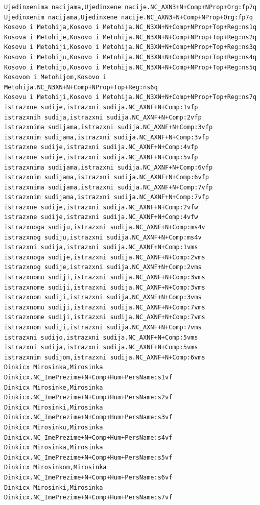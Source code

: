 \begin{verbatim}
Ujedinxenima nacijama,Ujedinxene nacije.NC_AXN3+N+Comp+NProp+Org:fp7q
Ujedinxenim nacijama,Ujedinxene nacije.NC_AXN3+N+Comp+NProp+Org:fp7q
Kosovo i Metohija,Kosovo i Metohija.NC_N3XN+N+Comp+NProp+Top+Reg:ns1q
Kosova i Metohije,Kosovo i Metohija.NC_N3XN+N+Comp+NProp+Top+Reg:ns2q
Kosovu i Metohiji,Kosovo i Metohija.NC_N3XN+N+Comp+NProp+Top+Reg:ns3q
Kosovo i Metohiju,Kosovo i Metohija.NC_N3XN+N+Comp+NProp+Top+Reg:ns4q
Kosovo i Metohijo,Kosovo i Metohija.NC_N3XN+N+Comp+NProp+Top+Reg:ns5q
Kosovom i Metohijom,Kosovo i Metohija.NC_N3XN+N+Comp+NProp+Top+Reg:ns6q
Kosovu i Metohiji,Kosovo i Metohija.NC_N3XN+N+Comp+NProp+Top+Reg:ns7q
istrazxne sudije,istrazxni sudija.NC_AXNF+N+Comp:1vfp
istrazxnih sudija,istrazxni sudija.NC_AXNF+N+Comp:2vfp
istrazxnima sudijama,istrazxni sudija.NC_AXNF+N+Comp:3vfp
istrazxnim sudijama,istrazxni sudija.NC_AXNF+N+Comp:3vfp
istrazxne sudije,istrazxni sudija.NC_AXNF+N+Comp:4vfp
istrazxne sudije,istrazxni sudija.NC_AXNF+N+Comp:5vfp
istrazxnima sudijama,istrazxni sudija.NC_AXNF+N+Comp:6vfp
istrazxnim sudijama,istrazxni sudija.NC_AXNF+N+Comp:6vfp
istrazxnima sudijama,istrazxni sudija.NC_AXNF+N+Comp:7vfp
istrazxnim sudijama,istrazxni sudija.NC_AXNF+N+Comp:7vfp
istrazxne sudije,istrazxni sudija.NC_AXNF+N+Comp:2vfw
istrazxne sudije,istrazxni sudija.NC_AXNF+N+Comp:4vfw
istrazxnoga sudiju,istrazxni sudija.NC_AXNF+N+Comp:ms4v
istrazxnog sudiju,istrazxni sudija.NC_AXNF+N+Comp:ms4v
istrazxni sudija,istrazxni sudija.NC_AXNF+N+Comp:1vms
istrazxnoga sudije,istrazxni sudija.NC_AXNF+N+Comp:2vms
istrazxnog sudije,istrazxni sudija.NC_AXNF+N+Comp:2vms
istrazxnomu sudiji,istrazxni sudija.NC_AXNF+N+Comp:3vms
istrazxnome sudiji,istrazxni sudija.NC_AXNF+N+Comp:3vms
istrazxnom sudiji,istrazxni sudija.NC_AXNF+N+Comp:3vms
istrazxnomu sudiji,istrazxni sudija.NC_AXNF+N+Comp:7vms
istrazxnome sudiji,istrazxni sudija.NC_AXNF+N+Comp:7vms
istrazxnom sudiji,istrazxni sudija.NC_AXNF+N+Comp:7vms
istrazxni sudijo,istrazxni sudija.NC_AXNF+N+Comp:5vms
istrazxni sudija,istrazxni sudija.NC_AXNF+N+Comp:5vms
istrazxnim sudijom,istrazxni sudija.NC_AXNF+N+Comp:6vms
Dinkicx Mirosinka,Mirosinka Dinkicx.NC_ImePrezime+N+Comp+Hum+PersName:s1vf
Dinkicx Mirosinke,Mirosinka Dinkicx.NC_ImePrezime+N+Comp+Hum+PersName:s2vf
Dinkicx Mirosinki,Mirosinka Dinkicx.NC_ImePrezime+N+Comp+Hum+PersName:s3vf
Dinkicx Mirosinku,Mirosinka Dinkicx.NC_ImePrezime+N+Comp+Hum+PersName:s4vf
Dinkicx Mirosinka,Mirosinka Dinkicx.NC_ImePrezime+N+Comp+Hum+PersName:s5vf
Dinkicx Mirosinkom,Mirosinka Dinkicx.NC_ImePrezime+N+Comp+Hum+PersName:s6vf
Dinkicx Mirosinki,Mirosinka Dinkicx.NC_ImePrezime+N+Comp+Hum+PersName:s7vf

\end{verbatim}
